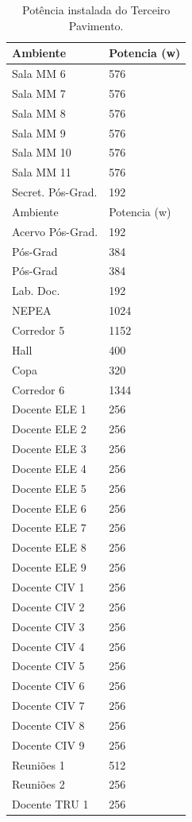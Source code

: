 \begin{longtable}[H]{ll}
\caption{Potência instalada do Terceiro Pavimento.}
\label{tab_pav2}\\\hline
Ambiente & Potencia (w) \\\hline
\endfirsthead
%
\endhead
%
Sala MM 6 & 576 \\
Sala MM 7 & 576 \\
Sala MM 8 & 576 \\
Sala MM 9 & 576 \\
Sala MM 10 & 576 \\
Sala MM 11 & 576 \\
Secret. Pós-Grad. & 192 \\
Ambiente & Potencia (w) \\\hline
Acervo Pós-Grad. & 192 \\
Pós-Grad & 384 \\
Pós-Grad & 384 \\
Lab. Doc. & 192 \\
NEPEA & 1024 \\
Corredor 5 & 1152 \\
Hall & 400 \\
Copa & 320 \\
Corredor 6 & 1344 \\
Docente ELE 1 & 256 \\
Docente ELE 2 & 256 \\
Docente ELE 3 & 256 \\
Docente ELE 4 & 256 \\
Docente ELE 5 & 256 \\
Docente ELE 6 & 256 \\
Docente ELE 7 & 256 \\
Docente ELE 8 & 256 \\
Docente ELE 9 & 256 \\
Docente CIV 1 & 256 \\
Docente CIV 2 & 256 \\
Docente CIV 3 & 256 \\
Docente CIV 4 & 256 \\
Docente CIV 5 & 256 \\
Docente CIV 6 & 256 \\
Docente CIV 7 & 256 \\
Docente CIV 8 & 256 \\
Docente CIV 9 & 256 \\
Reuniões 1 & 512 \\
Reuniões 2 & 256 \\
Docente TRU 1 & 256 \\

\end{longtable}
